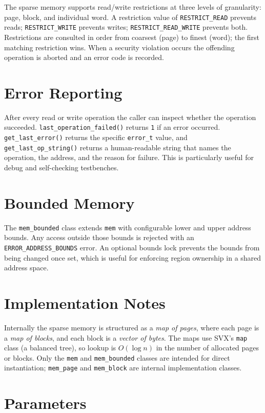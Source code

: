 \documentclass[11pt,letterpaper]{report}
\begin{document}
The sparse memory supports read/write restrictions at three levels of
granularity: page, block, and individual word.  A restriction value of
\texttt{RESTRICT\_READ} prevents reads; \texttt{RESTRICT\_WRITE} prevents
writes; \texttt{RESTRICT\_READ\_WRITE} prevents both.  Restrictions are
consulted in order from coarsest (page) to finest (word); the first
matching restriction wins.  When a security violation occurs the offending
operation is aborted and an error code is recorded.

\section*{Error Reporting}

After every read or write operation the caller can inspect whether the
operation succeeded.  \texttt{last\_operation\_failed()} returns
\texttt{1} if an error occurred.  \texttt{get\_last\_error()} returns the
specific \texttt{error\_t} value, and \texttt{get\_last\_op\_string()}
returns a human-readable string that names the operation, the address, and
the reason for failure.  This is particularly useful for debug and
self-checking testbenches.

\section*{Bounded Memory}

The \texttt{mem\_bounded} class extends \texttt{mem} with configurable
lower and upper address bounds.  Any access outside those bounds is
rejected with an \texttt{ERROR\_ADDRESS\_BOUNDS} error.  An optional
bounds lock prevents the bounds from being changed once set, which is
useful for enforcing region ownership in a shared address space.

\section*{Implementation Notes}

Internally the sparse memory is structured as a \emph{map of pages}, where
each page is a \emph{map of blocks}, and each block is a \emph{vector of
bytes}.  The maps use SVX's \texttt{map} class (a balanced tree), so
lookup is $O(\log n)$ in the number of allocated pages or blocks.  Only the
\texttt{mem} and \texttt{mem\_bounded} classes are intended for direct
instantiation; \texttt{mem\_page} and \texttt{mem\_block} are internal
implementation classes.

\section{Parameters}
\end{document}
